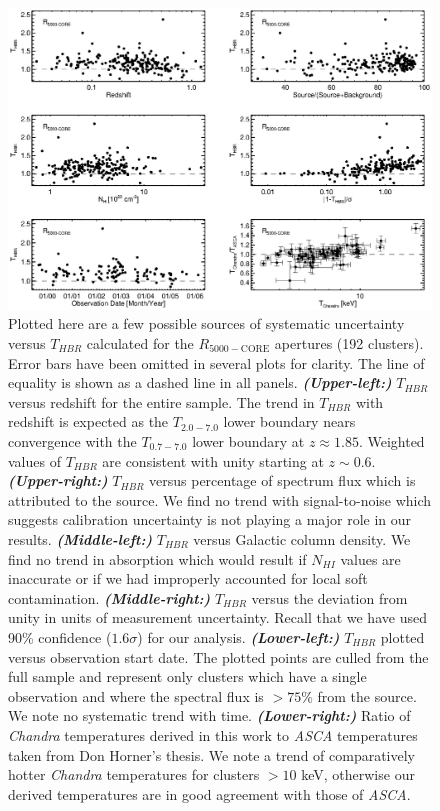 \documentclass[12pt,preprint]{aastex}
\begin{document}
\clearpage
\begin{figure}
\begin{center}
\includegraphics*[width=\textwidth, trim=0mm 0mm 0mm 0mm, clip]{f5.eps}
\caption{
Plotted here are a few possible sources of systematic uncertainty
versus $T_{HBR}$ calculated for the $R_{5000-\mathrm{CORE}}$
apertures (192 clusters). Error bars have been omitted in several plots for
clarity. The line of equality is shown as a dashed line in all
panels.
{\bfseries\em{(Upper-left:)}} $T_{HBR}$ versus redshift for the
entire sample. The trend in $T_{HBR}$ with redshift is expected as the
$T_{2.0-7.0}$ lower boundary nears convergence with the $T_{0.7-7.0}$
lower boundary at $z \approx 1.85$. Weighted values of $T_{HBR}$ are
consistent with unity starting at $z \sim
0.6$.
{\bfseries\em{(Upper-right:)}} $T_{HBR}$ versus percentage of
spectrum flux which is attributed to the source. We find no trend with
signal-to-noise which suggests calibration uncertainty is not playing
a major role in our results.
{\bfseries\em{(Middle-left:)}} $T_{HBR}$
versus Galactic column density. We find no trend in absorption which
would result if $N_{HI}$ values are inaccurate or if we had improperly
accounted for local soft
contamination.
{\bfseries\em{(Middle-right:)}} $T_{HBR}$ versus the
deviation from unity in units of measurement uncertainty. Recall that
we have used 90\% confidence ($1.6\sigma$) for our analysis.
{\bfseries\em{(Lower-left:)}} $T_{HBR}$ plotted versus
observation start date. The plotted points are culled from the full
sample and represent only clusters which have a single observation and
where the spectral flux is $> 75\%$ from the source. We note no
systematic trend with time.
{\bfseries\em{(Lower-right:)}} Ratio of {\it Chandra}
temperatures derived in this work to {\it ASCA} temperatures taken
from Don Horner's thesis. We note a trend of comparatively hotter {\it
Chandra} temperatures for clusters $> 10$ keV, otherwise our derived
temperatures are in good agreement with those of {\it ASCA}.
}
\label{fig:sysr50}
\end{center}
\end{figure}
\clearpage
\end{document}
